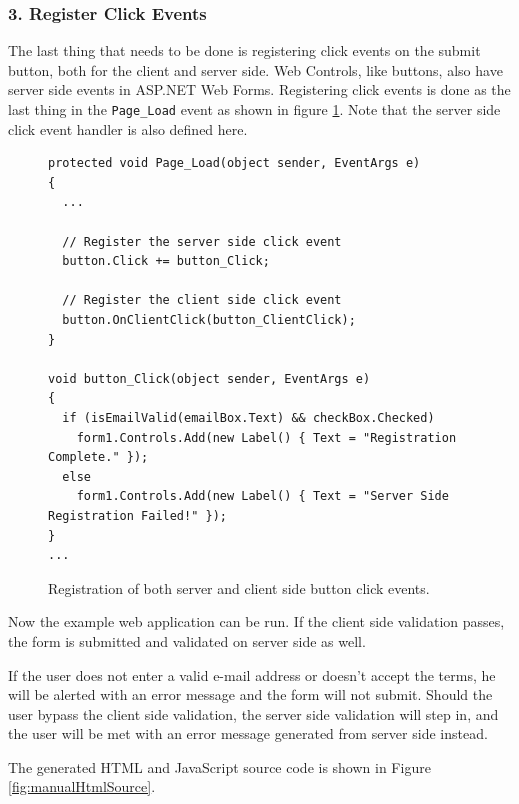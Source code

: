 \subsubsection{3. Register Click Events} %
\label{ssub:3_register_click_events}
	The last thing that needs to be done is registering click events on the submit button, both for the client and server side. Web Controls, like buttons, also have server side events in ASP.NET Web Forms. Registering click events is done as the last thing in the \texttt{Page\_Load} event as shown in figure \ref{fig:register_events}. Note that the server side click event handler is also defined here.
\begin{figure}[H]
\begin{lstlisting}[language=CSharp,classoffset=1,morekeywords={Default,MiCSPage,Button,CheckBox,TextBox,EventArgs,ClientSide,InputElement,Document,CheckBoxElement,Window,MixedSide,Regex}]
protected void Page_Load(object sender, EventArgs e)
{
  ...

  // Register the server side click event
  button.Click += button_Click;

  // Register the client side click event
  button.OnClientClick(button_ClientClick);
}

void button_Click(object sender, EventArgs e)
{
  if (isEmailValid(emailBox.Text) && checkBox.Checked)
    form1.Controls.Add(new Label() { Text = "Registration Complete." });
  else
    form1.Controls.Add(new Label() { Text = "Server Side Registration Failed!" });
}
...
\end{lstlisting}
\caption{Registration of both server and client side button click events.}
\label{fig:register_events}
\end{figure}


Now the example web application can be run. If the client side validation passes, the form is submitted and validated on server side as well.

If the user does not enter a valid e-mail address or doesn't accept the terms, he will be alerted with an error message and the form will not submit. Should the user bypass the client side validation, the server side validation will step in, and the user will be met with an error message generated from server side instead.

The generated HTML and JavaScript source code is shown in Figure \ref{fig:manualHtmlSource}.

